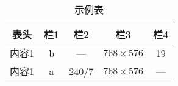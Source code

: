 \begin{table}[!t]
\caption{示例表}
\label{tab:eg}
\vspace{0.5em}
\centering
\wuhao
	\begin{tabular}{ccccc}
	\toprule[1.5pt]
	表头 & 栏1 & 栏2 & 栏3 & 栏4 \\
	\midrule[1pt]
	内容1 & b & --- & $768 \times 576$ & 19 \\
	内容1 & a & 240/7 & $768 \times 576$ & --- \\
	\bottomrule[1.5pt]
	\end{tabular}
\end{table}
